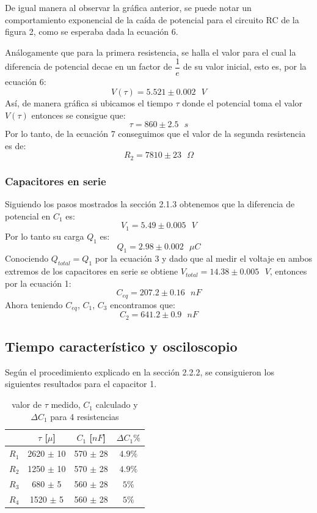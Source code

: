 \documentclass[10pt,letter]{article}
\begin{document}
\begin{multicols}{2}

De igual manera al observar la gráfica anterior, se puede notar un comportamiento exponencial de la caída de potencial para el circuito RC de la figura 2, como se esperaba dada la ecuación 6.

Análogamente que para la primera resistencia, se halla el valor para el cual la diferencia de potencial decae en un factor de $\dfrac{1}{e}$ de su valor inicial, esto es, por la ecuación 6:
$$V(\tau)=5.521 \pm0.002 \text{ } V$$
Así, de manera gráfica si ubicamos el tiempo $\tau$ donde el potencial toma el valor $V(\tau)$ entonces se consigue que:
$$\tau=860\pm2.5\text{ }s$$
Por lo tanto, de la ecuación 7 conseguimos que el valor de la segunda resistencia es de:
$$R_2=7810\pm23 \text{ }\Omega$$

\subsubsection{Capacitores en serie}
Siguiendo los pasos mostrados la sección 2.1.3 obtenemos que la diferencia de potencial en $C_1$ es:
$$V_1=5.49\pm 0.005\text{ }V$$
Por lo tanto su carga $Q_1$ es:
$$Q_1=2.98\pm0.002\text{ }\mu C$$
Conociendo $Q_{total}=Q_1$ por la ecuación 3 y dado que al medir el voltaje en ambos extremos de los capacitores en serie se obtiene $V_{total}=14.38\pm0.005\text{ }V$, entonces por la ecuación 1:
$$C_{eq}=207.2\pm0.16\text{ }nF$$
Ahora teniendo $C_{eq}$, $C_1$, $C_3$ encontramos que:
$$C_2=641.2\pm0.9\text{ }nF$$

\subsection{Tiempo característico y osciloscopio}
Según el procedimiento explicado en la sección 2.2.2, se consiguieron los siguientes resultados para el capacitor 1.


\begin{table}[H]
\centering
\begin{tabular}{|c|c|c|c|}
\hline
 & $\tau$ [$\mu$] & $C_1$ [$nF$] & $\Delta C_1 \%$ \\ \hline
$R_1$ & 2620 $\pm$ 10 & 570 $\pm$ 28 & $4.9\%$ \\ \hline
$R_2$ & 1250 $\pm$ 10 & 570 $\pm$ 28 & $4.9\%$ \\ \hline
$R_3$ & 680 $\pm$ 5 & 560 $\pm$ 28 & $5\%$ \\ \hline
$R_4$ & 1520 $\pm$ 5 & 560 $\pm$ 28 & $5\%$ \\ \hline
\end{tabular}
\caption{valor de $\tau$ medido, $C_1$ calculado y $\Delta C_1$ para 4 resistencias }
\end{table}


\end{multicols}
\end{document}
